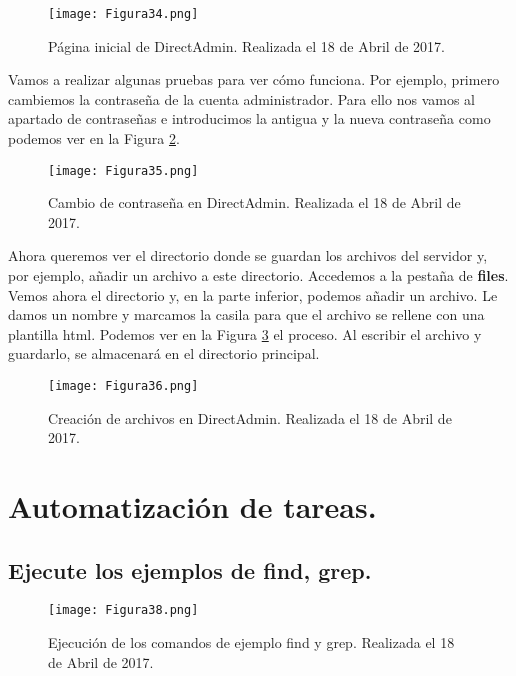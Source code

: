 \begin{figure}[H] 
\centering
\texttt{[image: Figura34.png]}  
\caption{Página inicial de DirectAdmin. Realizada el 18 de Abril de 2017.} \label{fig:figura34}
\end{figure}

Vamos a realizar algunas pruebas para ver cómo funciona. Por ejemplo, primero cambiemos la contraseña de la cuenta administrador. Para ello nos vamos al
apartado de contraseñas e introducimos la antigua y la nueva contraseña como podemos ver en la Figura \ref{fig:figura35}.

\begin{figure}[H] 
\centering
\texttt{[image: Figura35.png]}  
\caption{Cambio de contraseña en DirectAdmin. Realizada el 18 de Abril de 2017.} \label{fig:figura35}
\end{figure}

Ahora queremos ver el directorio donde se guardan los archivos del servidor y, por ejemplo, añadir un archivo a este directorio. Accedemos a la pestaña de \textbf{files}.
Vemos ahora el directorio y, en la parte inferior, podemos añadir un archivo. Le damos un nombre y marcamos la casila para que el archivo se rellene con una plantilla
html. Podemos ver en la Figura \ref{fig:figura36} el proceso. Al escribir el archivo y guardarlo, se almacenará en el directorio principal.

\begin{figure}[H] 
\centering
\texttt{[image: Figura36.png]}  
\caption{Creación de archivos en DirectAdmin. Realizada el 18 de Abril de 2017.} \label{fig:figura36}
\end{figure}



\section{Automatización de tareas.}

\subsection{Ejecute los ejemplos de find, grep.}

\begin{figure}[H] 
\centering
\texttt{[image: Figura38.png]}  
\caption{Ejecución de los comandos de ejemplo find y grep. Realizada el 18 de Abril de 2017.} \label{fig:figura38}
\end{figure}

